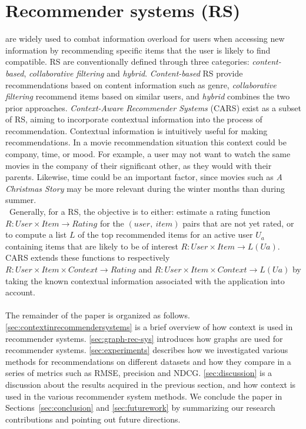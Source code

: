 \chapter{Recommender systems (RS)}\label{ch:introduction}
are widely used to combat information overload for users when accessing new information by recommending specific items that the user is likely to find compatible\cite{YouTubeNeural,IndustryPerspective}.
RS are conventionally defined through three categories: \textit{content-based}, \textit{collaborative filtering} and \textit{hybrid}.
\textit{Content-based} RS provide recommendations based on content information such as genre, \textit{collaborative filtering} recommend items based on similar users, and \textit{hybrid} combines the two prior approaches\cite{ContextSurvey2020}.
\textit{Context-Aware Recommender Systems} (CARS) exist as a subset of RS, aiming to incorporate contextual information into the process of recommendation.
Contextual information is intuitively useful for making recommendations.
In a movie recommendation situation this context could be company, time, or mood.
For example, a user may not want to watch the same movies in the company of their significant other, as they would with their parents.
Likewise, time could be an important factor, since movies such as \textit{A Christmas Story} may be more relevant during the winter months than during summer.\\\
Generally, for a RS, the objective is to either: estimate a rating function $R: User \times Item \rightarrow Rating$ for the $(user, \ item)$ pairs that are not yet rated, or to compute a list $L$ of the top recommended items for an active user $U_a$ containing items that are likely to be of interest $R: User \times Item \rightarrow L(Ua)$\cite{RecommenderHandbook2015}.
CARS extends these functions to respectively $R: User \times Item \times Context \rightarrow Rating$ and $R: User \times Item \times Context \rightarrow L(Ua)$ by taking the known contextual information associated with the application into account.
\\\\
The remainder of the paper is organized as follows. 
\autoref{sec:contextinrecommendersystems} is a brief overview of how context is used in recommender systems.
\autoref{sec:graph-rec-sys} introduces how graphs are used for recommender systems.
\autoref{sec:experiments} describes how we investigated various methods for recommendations on different datasets and how they compare in a series of metrics such as RMSE, precision and NDCG.
\autoref{sec:discussion} is a discussion about the results acquired in the previous section, and how context is used in the various recommender system methods.
We conclude the paper in Sections~\ref{sec:conclusion} and \ref{sec:futurework} by summarizing our research contributions and pointing out future directions.
